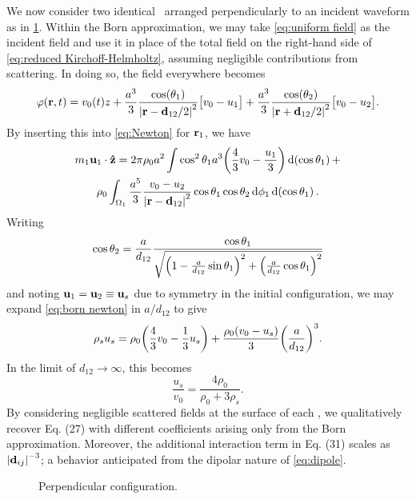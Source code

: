 We now consider two identical \bubbles\ arranged perpendicularly to an incident waveform as in \cref{fig:perpendicular}.
Within the Born approximation, we may take \cref{eq:uniform field} as the incident field and use it in place of the total field on the right-hand side of \cref{eq:reduced Kirchoff-Helmholtz}, assuming negligible contributions from scattering. In doing so, the field everywhere becomes
\begin{equation}
  \varphi(\vb{r}, t) = v_0(t) z + \frac{a^3}{3} \frac{\cos(\theta_1)}{\abs{\vb{r} - \vb{d}_{12}/2}^2}\qty\big[v_0 - u_1]
                                + \frac{a^3}{3} \frac{\cos(\theta_2)}{\abs{\vb{r} + \vb{d}_{12}/2}^2}\qty\big[v_0 - u_2].
\end{equation}
By inserting this into \cref{eq:Newton} for $\vb{r}_1$, we have
\begin{equation}
  \label{eq:born newton}
  \begin{gathered}
  m_1 \vb{u}_1 \cdot \vu{z} = 2 \pi \rho_0 a^2 \int \cos^2\theta_1 a^3 \qty(\frac{4}{3}v_0 - \frac{u_1}{3}) \dd{\qty(\cos\theta_1)} + \\
    \rho_0 \int_{\Omega_1} \frac{a^5}{3} \frac{v_0 - u_2}{\abs{\vb{r} - \vb{d}_{12}}^2} \cos\theta_1 \cos\theta_2 \dd{\phi_1} \dd{\qty(\cos \theta_1)}.
  \end{gathered}
\end{equation}
Writing
\begin{equation}
  \cos\theta_2 = \frac{a}{d_{12}} \frac{\cos\theta_1}{\sqrt{\qty(1 - \frac{a}{d_{12}}\sin\theta_1)^2 + \qty(\frac{a}{d_{12}}\cos\theta_1)^2}}
\end{equation}
and noting $\vb{u}_1 = \vb{u}_2 \equiv \vb{u}_s$ due to symmetry in the initial configuration, we may expand \cref{eq:born newton} in $a/d_{12}$ to give
\begin{equation}
  \label{eq:two bubble born}
  \rho_s u_s = \rho_0\qty(\frac{4}{3}v_0 - \frac{1}{3}u_s) + \frac{\rho_0\qty(v_0 - u_s)}{3}\qty(\frac{a}{d_{12}})^3.
\end{equation}
In the limit of $d_{12} \to \infty$, this becomes
\begin{equation}
  \frac{u_s}{v_0} = \frac{4 \rho_0}{\rho_0 + 3\rho_s}.
\end{equation}
By considering negligible scattered fields at the surface of each \bubble, we qualitatively recover Eq. (27) with different coefficients arising only from the Born approximation.
Moreover, the additional interaction term in Eq. (31) scales as $\abs{\vb{d}_{ij}}^{-3}$; a behavior anticipated from the dipolar nature of \cref{eq:dipole}.

\begin{figure}
  \centering
  \caption{\label{fig:perpendicular}Perpendicular configuration.}
\end{figure}

